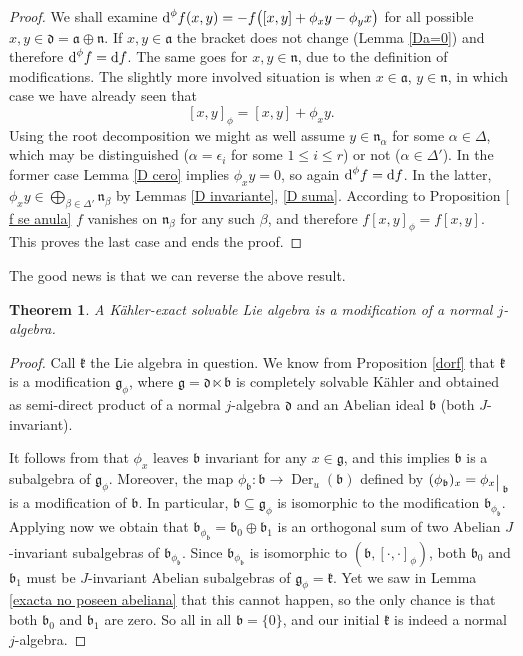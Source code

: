\documentclass[12pt, twoside]{amsart}
\def\D{\textup{d}}
\def\d{\mathfrak{d}}
\def\k{\mathfrak{k}}
\def\g{\mathfrak{g}}
\def\b{\mathfrak{b}}
\def\n{\mathfrak{n}}
\def\a{\mathfrak{a}}
\newcommand{\restr}{\raisebox{-.2em}{$\!\big\arrowvert$}}
\newtheorem{thm}[definition]{Theorem}
\theoremstyle{definition}
\begin{document}
\begin{proof} We shall examine $\D^{\phi}f(x,y)= -f\big([x,y]+\phi_x y-\phi_y x\big)$ for all possible $x,y \in \d=\a\oplus \n$. 
 If $x,y \in \a$ the bracket does not change (Lemma \ref{Da=0}) and therefore $\D^\phi f=\D f$. The same goes for $x,y \in \n$, due to the definition of modifications. The slightly more involved situation is when $x \in \a$, $y \in \n$, in which case we  have already seen that  
$$
        [x,y]_{\phi}=[x,y]+\phi_x y.
$$
Using the root decomposition we might as well assume $y\in \n_\alpha$ for some $\alpha\in \Delta$, which may be distinguished ($\alpha=\epsilon_i$ for some $1\leq i\leq r$) or not ($\alpha \in \Delta'$). In the former case Lemma \ref{D cero} implies $\phi_x y=0$, so again $\D^{\phi}f=\D f$.  
In the latter, $\phi_x y\in \bigoplus_{\beta \in \Delta'}\n_{\beta}$ by Lemmas \ref{D invariante}, \ref{D suma}. According to Proposition \ref{ f se anula} $f$ vanishes on $\n_\beta$ for any such $\beta$, and therefore $f[x,y]_\phi=f[x,y]$. 
This proves the last case and ends the proof.
\end{proof}

\smallskip

The good news is that we can reverse the above result. 

\begin{thm} \label{thm: exacta modi normal}
A K{\"a}hler-exact solvable Lie algebra is a modification of a normal $j$-algebra.
\end{thm}

\begin{proof} Call $\k$ the Lie algebra in question. We know from Proposition \ref{dorf} that $\k$ is a modification $\g_{\phi}$, where $\g=\d\ltimes \b$ is completely solvable K{\"a}hler and obtained as semi-direct product of a normal $j$-algebra $\d$ and an Abelian ideal $\mathfrak{b}$ (both $J$-invariant). 

It follows from \cite[Section 3.3, Lemma 2]{Dorf} that $\phi_x$ leaves $\b$ invariant for any $x\in\g$, and this implies $\b$ is a subalgebra of $\g_\phi$. Moreover, the map $\phi_\b:\b \to \operatorname{Der}_u(\b)$ defined by $(\phi_\b)_x=\phi_x\restr_\b$ is a modification of $\b$. In particular, $\b\subseteq \g_\phi$ is isomorphic to the modification $\b_{\phi_\b}$. Applying now \cite[Section 3.3, Lemma 1]{Dorf} we obtain that $\b_{\phi_{\b}}=\b_0 \oplus \b_1$ is an orthogonal sum of two Abelian $J$-invariant subalgebras of $\b_{\phi_\b}$. Since $\b_{\phi_\b}$ is isomorphic to $(\b,[\cdot,\cdot]_\phi)$, both $\b_0$ and $\b_1$ must be $J$-invariant Abelian subalgebras of $\g_\phi=\k$. Yet we saw  in Lemma \ref{exacta no poseen abeliana} that this cannot happen, so the only chance is that both $\mathfrak{b}_0$ and $\mathfrak{b}_1$ are zero. So all in all $\mathfrak{b} = \{0\}$, and our initial $\k$ is indeed a normal $j$-algebra.
\end{proof}
\end{document}
